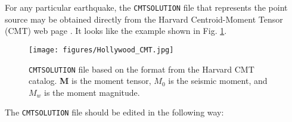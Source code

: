 For any particular earthquake, the \texttt{CMTSOLUTION} file that
represents the point source may be obtained directly from the Harvard
Centroid-Moment Tensor (CMT) web page .
It looks like the example shown in Fig. \ref{fig:CMTSOLUTION-file}.
\begin{figure}[htp]
\begin{centering}
\texttt{[image: figures/Hollywood\_CMT.jpg]}
\par
\end{centering}
\caption{\texttt{CMTSOLUTION} file based on the
format from the Harvard CMT catalog. \textbf{M} is the moment tensor,
$M_{0}${\small {} }is the seismic moment, and $M_{w}$ is the moment
magnitude.}
\label{fig:CMTSOLUTION-file}
\end{figure}
%
The \texttt{CMTSOLUTION} file should be edited in the following way:
